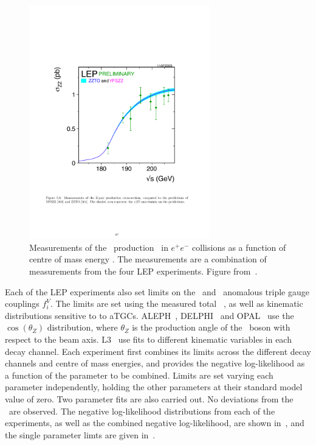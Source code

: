 \begin{figure}
\centering
        \includegraphics[width=0.7\textwidth]{lep_cx}
    \caption{Measurements of the \ZZ\ production \cx\ in  $e^+e^-$
    collisions as a function of centre of mass energy \sqrts. The
    measurements are a combination of measurements from the four LEP
    experiments. Figure from~\cite{bib:LEPEW2006}.}
    \label{fig:lep-cx}
\end{figure}

Each of the LEP experiments also set limits on the \ZZZ\ and \ZZg\ anomalous
triple gauge couplings $f_{i}^{V}$. The limits are set using the measured total
\ZZ\ \cx, as well as kinematic distributions sensitive to to aTGCs.
ALEPH~\cite{Schael:1166743}, DELPHI~\cite{Bambade:1002930} and
OPAL~\cite{Abbiendi:2000kq} use the $\cos(\theta_{Z})$ distribution, where
$\theta_{Z}$ is the production angle of the \Z\ boson with respect to the beam
axis. L3~\cite{Acciarri:1999ug} use fits to different kinematic variables in
each decay channel. Each experiment first combines its limits across the different
decay channels and centre of mass energies, and provides the negative
log-likelihood as a function of the parameter to be combined. Limits are set
varying each parameter independently, holding the other parameters at their
standard model value of zero. Two parameter
fits are also carried out. No deviations from the \sm\ are observed. The
negative log-likelihood distributions from each of the experiments, as well as the
combined negative log-likelihood, are shown in~, and the single
parameter limts are given in~.

